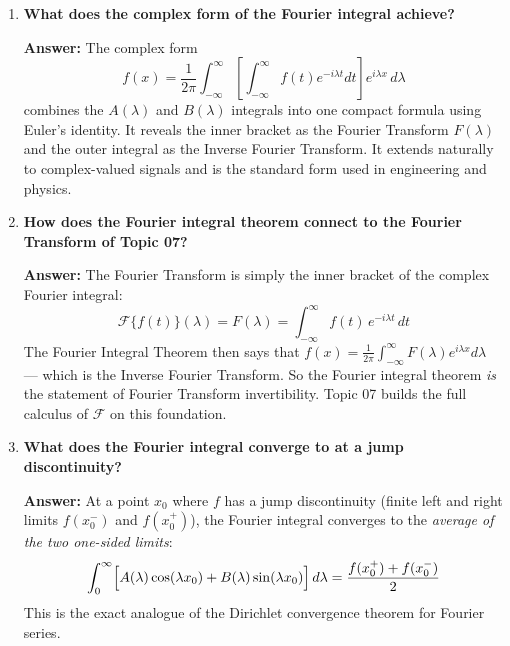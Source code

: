 \documentclass[12pt,a4paper]{article}
\begin{document}
\begin{enumerate}[label=\textbf{Q\arabic*.}]
\textbf{Answer:} Use the \textit{sine integral} when: (a) the function $f(x)$ is odd on $(-\infty,\infty)$, so $A(\lambda)=0$ automatically; or (b) $f$ is defined only on $(0,\infty)$ and you want to represent it with a purely sine expansion (extending it as an odd function). Use the \textit{cosine integral} when $f$ is even or when you want the even extension. If neither symmetry is present, use the full Fourier integral with both $A(\lambda)$ and $B(\lambda)$.

\item \textbf{What does the complex form of the Fourier integral achieve?}

\textbf{Answer:} The complex form
\[
f(x) = \frac{1}{2\pi}\int_{-\infty}^{\infty}\!\left[\int_{-\infty}^{\infty}f(t)e^{-i\lambda t}dt\right]e^{i\lambda x}\,d\lambda
\]
combines the $A(\lambda)$ and $B(\lambda)$ integrals into one compact formula using Euler's identity. It reveals the inner bracket as the Fourier Transform $F(\lambda)$ and the outer integral as the Inverse Fourier Transform. It extends naturally to complex-valued signals and is the standard form used in engineering and physics.

\item \textbf{How does the Fourier integral theorem connect to the Fourier Transform of Topic 07?}

\textbf{Answer:} The Fourier Transform is simply the inner bracket of the complex Fourier integral:
\[
\mathcal{F}\{f(t)\}(\lambda) = F(\lambda) = \int_{-\infty}^{\infty}f(t)\,e^{-i\lambda t}\,dt
\]
The Fourier Integral Theorem then says that $f(x) = \frac{1}{2\pi}\int_{-\infty}^\infty F(\lambda)e^{i\lambda x}d\lambda$ --- which is the Inverse Fourier Transform. So the Fourier integral theorem \textit{is} the statement of Fourier Transform invertibility. Topic 07 builds the full calculus of $\mathcal{F}$ on this foundation.

\item \textbf{What does the Fourier integral converge to at a jump discontinuity?}

\textbf{Answer:} At a point $x_0$ where $f$ has a jump discontinuity (finite left and right limits $f(x_0^-)$ and $f(x_0^+)$), the Fourier integral converges to the \textit{average of the two one-sided limits}:
\[
\int_0^\infty \Bigl[A(\lambda)\cos(\lambda x_0)+B(\lambda)\sin(\lambda x_0)\Bigr]\,d\lambda = \frac{f(x_0^+)+f(x_0^-)}{2}
\]
This is the exact analogue of the Dirichlet convergence theorem for Fourier series.

\end{enumerate}
\end{document}
